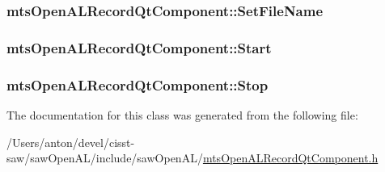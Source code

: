 \subsubsection[{Set\+File\+Name}]{ mts\+Open\+A\+L\+Record\+Qt\+Component\+::\+Set\+File\+Name}\label{classmts_open_a_l_record_qt_component_aef16f641d7b22e0ea8f6995e689dced5}
\hypertarget{classmts_open_a_l_record_qt_component_a08e66f3406a5e1e671d804eb7f5151b2}{}
\subsubsection[{Start}]{ mts\+Open\+A\+L\+Record\+Qt\+Component\+::\+Start}\label{classmts_open_a_l_record_qt_component_a08e66f3406a5e1e671d804eb7f5151b2}
\hypertarget{classmts_open_a_l_record_qt_component_a1f3cb667990465971031f0ee0c2f96e6}{}
\subsubsection[{Stop}]{ mts\+Open\+A\+L\+Record\+Qt\+Component\+::\+Stop}\label{classmts_open_a_l_record_qt_component_a1f3cb667990465971031f0ee0c2f96e6}


The documentation for this class was generated from the following file\+:\begin{DoxyCompactItemize}
\item 
/\+Users/anton/devel/cisst-\/saw/saw\+Open\+A\+L/include/saw\+Open\+A\+L/\hyperlink{mts_open_a_l_record_qt_component_8h}{mts\+Open\+A\+L\+Record\+Qt\+Component.\+h}\end{DoxyCompactItemize}
